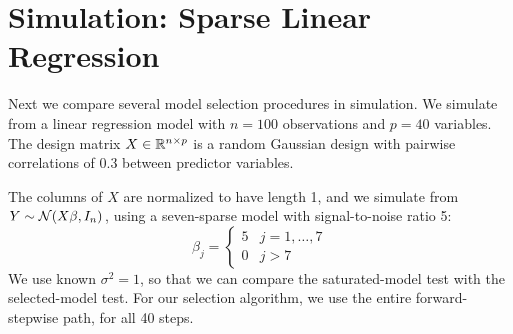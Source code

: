 \documentclass{article}
\begin{document}

\section{Simulation: Sparse Linear Regression}
\label{sec:sparseReg}

Next we compare several model selection procedures in simulation. We simulate from a linear regression model with $n=100$ observations and $p=40$ variables. The design matrix $X\in\mathbb{R}^{n\times p}$ is a random Gaussian design with pairwise correlations of 0.3 between predictor variables.

The columns of $X$ are normalized to have length 1, and we simulate from $Y \sim \mathcal{N}(X\beta,I_n)$, using a seven-sparse model with signal-to-noise ratio 5:
\[
\beta_j = \left\{\begin{matrix}5 & j = 1,\ldots,7\\ 0 &
    j>7\end{matrix}\right.
\]
We use known $\sigma^2=1$, so that we can compare the saturated-model test with the selected-model test. For our selection algorithm, we use the entire forward-stepwise path, for all 40 steps. 
\end{document}
